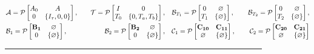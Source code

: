 \documentclass[twocolumn]{autart}    %
\begin{document}
\begin{figure}[hb] %
    \flushleft
\begin{equation}
    \begin{aligned}
        &\mathcal{A} = \mathcal{P} 
            \begin{bmatrix}
                A_{0} & A \\
                0 & \{I_{\tau},0,0\} 
            \end{bmatrix} ,\quad &\mathcal{T} = \mathcal{P} 
            \begin{bmatrix}
                I & 0 \\
                T_{0} & \{0,T_{a},T_{b}\} 
            \end{bmatrix},\quad &\mathcal{B}_{T_{1}} = \mathcal{P} 
            \begin{bmatrix}
                0 & \varnothing \\
                T_{1} & \{\varnothing\} 
            \end{bmatrix} ,\quad &\mathcal{B}_{T_{2}} = \mathcal{P} 
            \begin{bmatrix}
                0 & \varnothing \\
                T_{2} & \{\varnothing\} 
            \end{bmatrix},\\
        &\mathcal{B}_{1} = \mathcal{P} 
        \begin{bmatrix}
            \bold{B_{1}} & \varnothing \\
            0 & \{\varnothing\} 
        \end{bmatrix},\quad &\mathcal{B}_{2} = \mathcal{P} 
        \begin{bmatrix}
            \bold{B_{2}} & \varnothing \\
            0 & \{\varnothing\} 
        \end{bmatrix},\quad &\mathcal{C}_{1} = \mathcal{P} 
        \begin{bmatrix}
            \bold{C_{10}} & \bold{C_{11}} \\
            \varnothing & \{\varnothing\} 
        \end{bmatrix}, \quad &\mathcal{C}_{2} = \mathcal{P} 
        \begin{bmatrix}
            \bold{C_{20}} & \bold{C_{21}} \\
            \varnothing & \{\varnothing\} 
        \end{bmatrix}
    \end{aligned}
\end{equation}
\vspace{1.5em}
{\noindent}	 \rule[-10pt]{17.5cm}{0.05em}\\
\end{figure}
\end{document}
